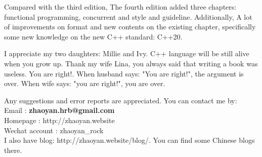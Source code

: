 \documentclass[a4paper,11pt,twoside]{book}
\begin{document}
\medskip

Compared with the third edition, The fourth edition added three chapters: functional programming, concurrent and style and guideline. Additionally, A lot of improvements on format and new contents on the existing chapter, specifically some new knowledge on the new C++ standard: C++20. \medskip  


I appreciate my two daughters: Millie and Ivy. C++ language will be still alive when you grow up.  Thank my wife Lina, you always said that writing a book was useless. You are right!. When husband says: "You are right!", the argument is over. When wife says: "you are right!", you are over. \par \par \medskip


Any suggestions and error reports are appreciated. You can contact me by: \\
Email          : \textbf{zhaoyan.hrb@gmail.com}  \\ 
Homepage       : http://zhaoyan.website  \\ 
Wechat account : zhaoyan\_rock   \\ 

I also have blog: http://zhaoyan.website/blog/. You can find some Chinese blogs there. 
\end{document}

